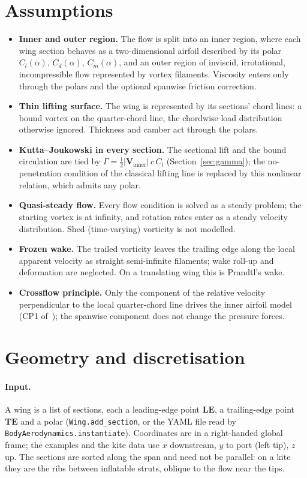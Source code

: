 \documentclass[11pt,a4paper]{article}
\newcommand{\vect}[1]{\mathbf{#1}}
\newcommand{\code}[1]{\texttt{#1}}
\begin{document}
\section{Assumptions}
\label{sec:assumptions}
\begin{itemize}[nosep]
  \item \textbf{Inner and outer region.} The flow is split into an inner region, where each wing section behaves as a two-dimensional airfoil described by its polar $C_l(\alpha)$, $C_d(\alpha)$, $C_m(\alpha)$, and an outer region of inviscid, irrotational, incompressible flow represented by vortex filaments. Viscosity enters only through the polars and the optional spanwise friction correction.
  \item \textbf{Thin lifting surface.} The wing is represented by its sections' chord lines: a bound vortex on the quarter-chord line, the chordwise load distribution otherwise ignored. Thickness and camber act through the polars.
  \item \textbf{Kutta--Joukowski in every section.} The sectional lift and the bound circulation are tied by $\Gamma=\tfrac12|\vect V_{\mathrm{inner}}|\,c\,C_l$ (Section~\ref{sec:gamma}); the no-penetration condition of the classical lifting line is replaced by this nonlinear relation, which admits any polar.
  \item \textbf{Quasi-steady flow.} Every flow condition is solved as a steady problem; the starting vortex is at infinity, and rotation rates enter as a steady velocity distribution. Shed (time-varying) vorticity is not modelled.
  \item \textbf{Frozen wake.} The trailed vorticity leaves the trailing edge along the local apparent velocity as straight semi-infinite filaments; wake roll-up and deformation are neglected. On a translating wing this is Prandtl's wake.
  \item \textbf{Crossflow principle.} Only the component of the relative velocity perpendicular to the local quarter-chord line drives the inner airfoil model (CP1 of~\cite{gaunaa2026}); the spanwise component does not change the pressure forces.
\end{itemize}

\section{Geometry and discretisation}
\label{sec:geometry}
\paragraph{Input.} A wing is a list of sections, each a leading-edge point $\vect{LE}$, a trailing-edge point $\vect{TE}$ and a polar (\code{Wing.add\_section}, or the YAML file read by \code{BodyAerodynamics.instantiate}). Coordinates are in a right-handed global frame; the examples and the kite data use $x$ downstream, $y$ to port (left tip), $z$ up. The sections are sorted along the span and need not be parallel: on a kite they are the ribs between inflatable struts, oblique to the flow near the tips.
\end{document}
